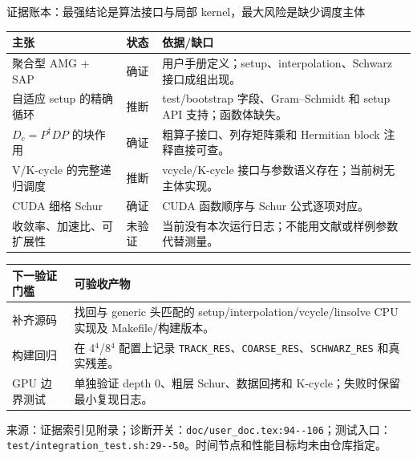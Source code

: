 \documentclass[UTF8,aspectratio=169,11pt]{ctexbeamer}
\newcommand{\source}[1]{%
  \vspace{0.06em}\par{\raggedright\scriptsize\color{muted}来源：#1\par}}
\newcommand{\verified}{\textcolor{evidence}{确证}}
\newcommand{\inferred}{\textcolor{accent}{推断}}
\newcommand{\unverified}{\textcolor{warning}{未验证}}
\newcommand{\code}[1]{\nolinkurl{#1}}
\newcommand{\denseframe}{%
  \footnotesize
  \setlength{\tabcolsep}{2.5pt}%
  \renewcommand{\arraystretch}{0.76}%
}
\begin{document}
\begin{frame}[t]{证据账本：最强结论是算法接口与局部 kernel，最大风险是缺少调度主体}
  \denseframe
  \scriptsize
  \begin{tabularx}{0.96\textwidth}{@{}p{}p{}Y@{}}
    \toprule
    主张 & 状态 & 依据/缺口 \\
    \midrule
    聚合型 AMG + SAP & \verified & 用户手册定义；setup、interpolation、Schwarz 接口成组出现。 \\
    自适应 setup 的精确循环 & \inferred & test/bootstrap 字段、Gram--Schmidt 和 setup API 支持；函数体缺失。 \\
    $D_c=P^\dagger D P$ 的块作用 & \verified & 粗算子接口、列存矩阵乘和 Hermitian block 注释直接可查。 \\
    V/K-cycle 的完整递归调度 & \inferred & vcycle/K-cycle 接口与参数语义存在；当前树无主体实现。 \\
    CUDA 细格 Schur & \verified & CUDA 函数顺序与 Schur 公式逐项对应。 \\
    收敛率、加速比、可扩展性 & \unverified & 当前没有本次运行日志；不能用文献或样例参数代替测量。 \\
    \bottomrule
  \end{tabularx}
  \vspace{0.12cm}
  \begin{tabularx}{0.96\textwidth}{@{}p{}Y@{}}
    \toprule
    下一验证门槛 & 可验收产物 \\
    \midrule
    补齐源码 & 找回与 generic 头匹配的 setup/interpolation/vcycle/linsolve CPU 实现及 Makefile/构建版本。 \\
    构建回归 & 在 4$^4$/8$^4$ 配置上记录 \code{TRACK_RES}、\code{COARSE_RES}、\code{SCHWARZ_RES} 和真实残差。 \\
    GPU 边界测试 & 单独验证 depth 0、粗层 Schur、数据回拷和 K-cycle；失败时保留最小复现日志。 \\
    \bottomrule
  \end{tabularx}
  \source{证据索引见附录；诊断开关：\code{doc/user_doc.tex:94--106}；测试入口：\code{test/integration_test.sh:29--50}。时间节点和性能目标均未由仓库指定。}
\end{frame}
\end{document}
